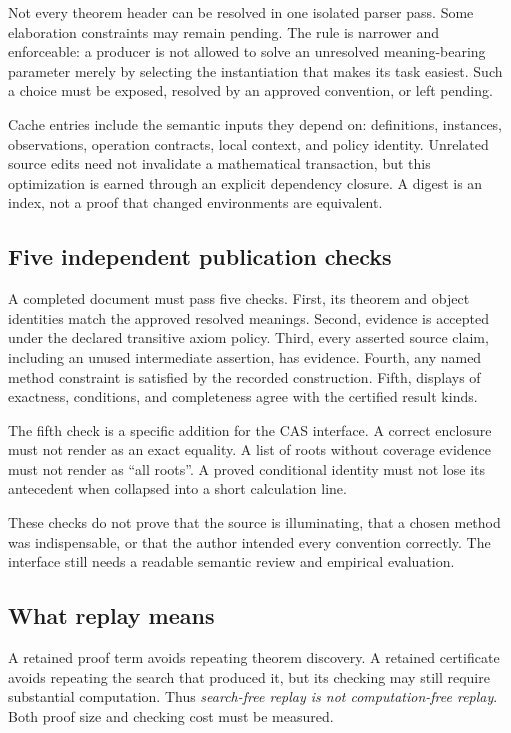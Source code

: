 \documentclass[11pt,a4paper]{article}
\theoremstyle{definition}
\begin{document}
Not every theorem header can be resolved in one isolated parser pass. Some
elaboration constraints may remain pending. The rule is narrower and enforceable:
a producer is not allowed to solve an unresolved meaning-bearing parameter
merely by selecting the instantiation that makes its task easiest. Such a choice
must be exposed, resolved by an approved convention, or left pending.

Cache entries include the semantic inputs they depend on: definitions, instances,
observations, operation contracts, local context, and policy identity. Unrelated
source edits need not invalidate a mathematical transaction, but this optimization
is earned through an explicit dependency closure. A digest is an index, not a
proof that changed environments are equivalent.

\subsection{Five independent publication checks}
A completed document must pass five checks. First, its theorem and object
identities match the approved resolved meanings. Second, evidence is accepted
under the declared transitive axiom policy. Third, every asserted source claim,
including an unused intermediate assertion, has evidence. Fourth, any named
method constraint is satisfied by the recorded construction. Fifth, displays
of exactness, conditions, and completeness agree with the certified result kinds.

The fifth check is a specific addition for the CAS interface. A correct enclosure
must not render as an exact equality. A list of roots without coverage evidence
must not render as ``all roots''. A proved conditional identity must not lose
its antecedent when collapsed into a short calculation line.

These checks do not prove that the source is illuminating, that a chosen method
was indispensable, or that the author intended every convention correctly.
The interface still needs a readable semantic review and empirical evaluation.

\subsection{What replay means}
A retained proof term avoids repeating theorem discovery. A retained certificate
avoids repeating the search that produced it, but its checking may still require
substantial computation. Thus \emph{search-free replay is not computation-free
replay}. Both proof size and checking cost must be measured.
\end{document}
